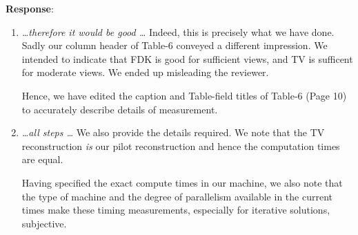 \documentclass[11pt]{article}
\begin{document}
\textbf{Response}:

\begin{enumerate}

\item \emph{ \ldots therefore it would be good \ldots } Indeed, this
  is precisely what we have done.  Sadly our column header of Table-6
  conveyed a different impression. We intended to indicate that FDK is
  good for sufficient views, and TV is sufficent for moderate
  views. We ended up misleading the reviewer.
  
  Hence, we have edited the caption and Table-field titles of Table-6
  (Page 10) to accurately describe details of measurement. 

\item \emph{ \ldots all steps \ldots} We also provide the details
  required.  We note that the TV reconstruction \emph{is} our pilot
  reconstruction and hence the computation times are equal.

  Having specified the exact compute times in our machine, we also
  note that the type of machine and the degree of parallelism
  available in the current times make these timing measurements,
  especially for iterative solutions, subjective.

\end{enumerate}
\end{document}

